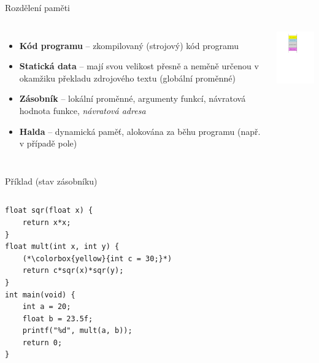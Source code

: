 \documentclass[14pt,aspectratio=169]{beamer}
\begin{document}
    \begin{frame}[t]{Rozdělení paměti}
        \begin{columns}[onlytextwidth,T]
            \column{\dimexpr\linewidth-30mm-3mm}
            \begin{itemize}
                \item \textbf{Kód programu} -- zkompilovaný (strojový) kód programu
                \item \textbf{Statická data} -- mají svou velikost přesně a neměně určenou v okamžiku překladu zdrojového textu (globální proměnné)
                \item \textbf{Zásobník} -- lokální proměnné, argumenty funkcí, návratová hodnota funkce, \emph{návratová adresa}
                \item \textbf{Halda} -- dynamická paměť, alokována za běhu programu (např. v případě pole)
            \end{itemize}
      
            \column{30mm}
            \includegraphics[width=30mm]{images/program_v_pameti.pdf}
        \end{columns}
    \end{frame}

    \begin{frame}[t,fragile]{Příklad (stav zásobníku)}
        \begin{columns}[onlytextwidth]
            \begin{column}{0.55\textwidth}
                \begin{lstlisting}
float sqr(float x) {
    return x*x;
}
float mult(int x, int y) {
    (*\colorbox{yellow}{int c = 30;}*)
    return c*sqr(x)*sqr(y);
}
int main(void) {
    int a = 20;
    float b = 23.5f;
    printf("%d", mult(a, b));
    return 0;
}
                \end{lstlisting}
            \end{column}
            \begin{column}{0.4\textwidth}
                
            \end{column}
        \end{columns}
    \end{frame}
\end{document}
